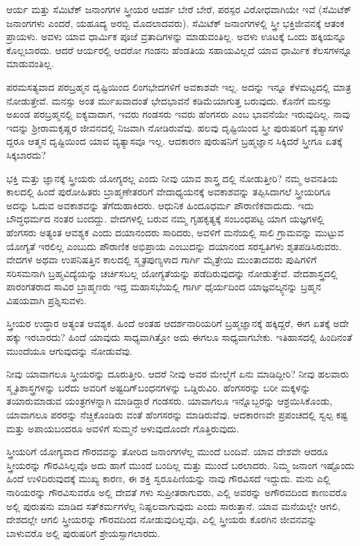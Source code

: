 ಆರ್ಯ ಮತ್ತು ಸೆಮಿಟೆಕ್ ಜನಾಂಗಗಳ ಸ್ತ್ರೀಯರ ಆದರ್ಶ ಬೇರೆ ಬೇರೆ, ಪರಸ್ಪರ ವಿರೋಧವಾಗಿಯೇ ಇವೆ (ಸೆಮಿಟೆಕ್ ಜನಾಂಗಗಳು ಎಂದರೆ, ಯಹೂದ್ಯ ಅರಬ್ಬಿ ಮೊದಲಾದವರು). ಸೆಮಿಟೆಕ್ ಜನಾಂಗಗಳಲ್ಲಿ ಸ್ತ್ರೀ ಭಕ್ತಿಜೀವನಕ್ಕೆ ಆತಂಕ ಪ್ರಾಯಳು. ಅವಳು ಯಾವ ಧಾರ್ಮಿಕ ಪೂಜೆ ವ್ರತಾದಿಗಳನ್ನು ಮಾಡುವಂತಿಲ್ಲ. ಅವಳು ಊಟಕ್ಕೆ ಒಂದು ಹಕ್ಕಿಯನ್ನೂ ಕೊಲ್ಲಬಾರದು. ಆದರೆ ಆರ್ಯರಲ್ಲಿ ಆದರೋ ಗಂಡನು ಹೆಂಡತಿಯ ಸಹಾಯವಿಲ್ಲದೆ ಯಾವ ಧಾರ್ಮಿಕ ಕೆಲಸಗಳನ್ನೂ ಮಾಡುವಂತಿಲ್ಲ.

ಪರಮಸತ್ಯವಾದ ಪರಬ್ರಹ್ಮನ ದೃಷ್ಟಿಯಿಂದ ಲಿಂಗಭೇದಗಳಿಗೆ ಅವಕಾಶವೇ ಇಲ್ಲ. ಅದನ್ನು ಇನ್ನೂ ಕೆಳಮಟ್ಟದಲ್ಲಿ ಮಾತ್ರ ನೋಡುತ್ತೇವೆ. ಮನಸ್ಸು ಅಂತ ರ್ಮುಖವಾದಂತೆ ಭೇದಭಾವನೆ ಕಡಿಮೆಯಾಗುತ್ತ ಬರುವುದು. ಕೊನೆಗೆ ಮನಸ್ಸು ಅಖಂಡ ಪರಬ್ರಹ್ಮನಲ್ಲಿ ಐಕ್ಯವಾದಾಗ, ಇವರು ಗಂಡಸರು ಇವರು ಹೆಂಗಸರು ಎಂಬ ಭಾವನೆಯೇ ಇರುವುದಿಲ್ಲ. ನಾವು ಇದನ್ನು ಶ್ರೀರಾಮಕೃಷ್ಣರ ಜೀವನದಲ್ಲಿ ನಿಜವಾಗಿ ನೋಡಿರುವೆವು. ಹಲವು ದೃಷ್ಟಿಯಿಂದ ಸ್ತ್ರೀ ಪುರುಷರಿಗೆ ವ್ಯತ್ಯಾಸಗಳಿ ದ್ದರೂ ಆತ್ಮನ ದೃಷ್ಟಿಯಿಂದ ಯಾವ ವ್ಯತ್ಯಾಸವೂ ಇಲ್ಲ. ಆದಕಾರಣ ಪುರುಷನಿಗೆ ಬ್ರಹ್ಮಜ್ಞಾನ ಸಿಕ್ಕಿದರೆ ಸ್ತ್ರೀಗೂ ಏತಕ್ಕೆ ಸಿಕ್ಕಬಾರದು?

ಭಕ್ತಿ ಮತ್ತು ಜ್ಞಾನಕ್ಕೆ ಸ್ತ್ರೀಯರು ಯೋಗ್ಯರಲ್ಲ ಎಂದು ನೀವು ಯಾವ ಶಾಸ್ತ್ರ ದಲ್ಲಿ ನೋಡುತ್ತೀರಿ? ನಮ್ಮ ಅವನತಿಯ ಕಾಲದಲ್ಲಿ ಹಿಂದೆ ಪುರೋಹಿತರು ಬ್ರಾಹ್ಮಣೇತರರಿಗೆ ವೇದಾಧ್ಯಯನಕ್ಕೆ ಅವಕಾಶವನ್ನು ತಪ್ಪಿಸಿದಾಗಲೆ ಸ್ತ್ರೀಯರಿಗೂ ಅದನ್ನು ಓದುವ ಅವಕಾಶವನ್ನು ತೆಗೆದುಹಾಕಿದರು. ಆಧುನಿಕ ಹಿಂದೂಧರ್ಮ ಪೌರಾಣಿಕವಾದುದು. ಇದು ಬೌದ್ಧಧರ್ಮದ ನಂತರ ಬಂದದ್ದು. ವೇದಗಳಲ್ಲಿ ಬರುವ ನಮ್ಮ ಗೃಹಕೃತ್ಯಕ್ಕೆ ಸಂಬಂಧಪಟ್ಟ ಯಾಗ ಯಜ್ಞಗಳಲ್ಲಿ ಹೆಂಗಸರು ಅತ್ಯಂತ ಆವಶ್ಯಕ ಎಂದು ದಯಾನಂದರು ಸಾರಿದರು, ಅವಳಿಗೆ ಮನೆಯಲ್ಲಿ ಸಾಲಿ ಗ್ರಾಮವನ್ನು ಮುಟ್ಟುವ ಯೋಗ್ಯತೆ ಇರಲಿಲ್ಲ ಎಂಬುದು ಪೌರಾಣಿಕ ಅಭಿಪ್ರಾಯ ಎಂಬುದನ್ನು ದಯಾನಂದ ಸರಸ್ವತಿಗಳು ಶೃತಪಡಿಸಿರುವರು. ವೇದಗಳ ಅಥವಾ ಉಪನಿಷತ್ತಿನ ಕಾಲದಲ್ಲಿ ಸ್ಮೃತಪುಣ್ಯಳಾದ ಗಾರ್ಗಿ ಮೈತ್ರೇಯಿ ಮುಂತಾದವರು ಪುಷಿಗಳಿಗೆ ಸರಿಸಮನಾಗಿ ಬ್ರಹ್ಮವಿದ್ಯೆಯನ್ನು ಚರ್ಚಿಸಬಲ್ಲ ಯೋಗ್ಯತೆಯನ್ನು ಪಡೆದಿರುವುದನ್ನು ನೋಡುತ್ತೇವೆ. ವೇದಶಾಸ್ತ್ರದಲ್ಲಿ ಪಾರಂಗತರಾದ ಸಾವಿರ ಬ್ರಾಹ್ಮಣರು ಇದ್ದ ಮಹಾಸಭೆಯಲ್ಲಿ ಗಾರ್ಗಿ ಧೈರ್ಯದಿಂದ ಯಾಜ್ಞವಲ್ಕ್ಯನನ್ನು ಬ್ರಹ್ಮನ ವಿಷಯವಾಗಿ ಪ್ರಶ್ನಿಸುವಳು.

ಸ್ತ್ರೀಯರ ಉದ್ಧಾರ ಅತ್ಯಂತ ಆವಶ್ಯಕ. ಹಿಂದೆ ಅಂತಹ ಆದರ್ಶನಾರಿಯರಿಗೆ ಬ್ರಹ್ಮಜ್ಞಾನಕ್ಕೆ ಹಕ್ಕಿದ್ದರೆ, ಈಗ ಏತಕ್ಕೆ ಅದೇ ಹಕ್ಕು ಇರಬಾರದು? ಹಿಂದೆ ಯಾವುದು ಸಾಧ್ಯವಾಗಿತ್ತೋ ಅದು ಈಗಲೂ ಸಾಧ್ಯವಾಗಬೇಕು. ಇತಿಹಾಸದಲ್ಲಿ ಹಿಂದಿನಂತೆ ಮುಂದೆಯೂ ಆಗುವುದನ್ನು ನೋಡುವೆವು.

ನೀವು ಯಾವಾಗಲೂ ಸ್ತ್ರೀಯರನ್ನು ದೂರುತ್ತೀರಿ. ಆದರೆ ನೀವು ಅವರ ಮೇಲ್ಮೆಗೆ ಏನು ಮಾಡಿದ್ದೀರಿ? ನೀವು ಹಲವಾರು ಸ್ಮೃತಿಶಾಸ್ತ್ರಗಳನ್ನು ಬರೆದು ಅವರಿಗೆ ಅಷ್ಟದಿಗ್​ಬಂಧನಗಳನ್ನು ಒಡ್ಡಿರುವಿರಿ. ಹೆಂಗಸರನ್ನು ಬರೀ ಮಕ್ಕಳನ್ನು ತಯಾರುಮಾಡುವ ಯಂತ್ರಗಳನ್ನಾಗಿ ಮಾಡಿದ್ದಾರೆ ಗಂಡಸರು. ಯಾವಾಗಲೂ ಇನ್ನೊಬ್ಬರನ್ನು ಆಶ್ರಯಿಸಿಕೊಂಡು, ಯಾವಾಗಲೂ ಪರರನ್ನು ನೆಚ್ಚಿಕೊಂಡಿರು ವಂತೆ ಹೆಂಗಸರನ್ನು ಮಾಡಿರುವೆವು. ಆದಕಾರಣವೇ ಪ್ರಪಂಚದಲ್ಲಿ ಸ್ವಲ್ಪ ಕಷ್ಟ ಮತ್ತು ಅಪಾಯಬಂದರೂ ಅವಳಿಗೆ ಸುಮ್ಮನೆ ಅಳುವುದೊಂದೇ ಗೊತ್ತಿರುವುದು.

ಸ್ತ್ರೀಯರಿಗೆ ಯೋಗ್ಯವಾದ ಗೌರವವನ್ನು ತೋರಿದ ಜನಾಂಗಗಳೆಲ್ಲ ಮುಂದೆ ಬಂದಿವೆ. ಯಾವ ದೇಶವೇ ಆದರೂ ಸ್ತ್ರೀಯರನ್ನು ಗೌರವಿಸಿಲ್ಲವೊ ಅದು ಹಾಗೆ ಮುಂದೆ ಬಂದಿಲ್ಲ ಮತ್ತು ಮುಂದೆ ಬರಲಾದರು. ನಿಮ್ಮ ಜನಾಂಗ ಇಷ್ಟೊಂದು ಹಿಂದೆ ಉಳಿದಿರುವುದಕ್ಕೆ ಮುಖ್ಯ ಕಾರಣ, ಈ ಶಕ್ತಿ ಸ್ವರೂಪಿಣಿಯನ್ನು ನಾವು ಗೌರವಿಸದೆ ಇದ್ದುದು. ಮನು ಎಲ್ಲಿ ನಾರಿಯರನ್ನು ಗೌರವಿಸುವರೊ ಅಲ್ಲಿ ದೇವತೆ ಗಳು ಸುಪ್ರೀತರಾಗುವರು, ಎಲ್ಲಿ ಅವರನ್ನು ಅಗೌರವದಿಂದ ಕಾಣುವರೊ ಅಲ್ಲಿ ಪುರುಷನು ಮಾಡಿದ ಸತ್​ಕರ್ಮಗಳೆಲ್ಲ ನಿಷ್ಫಲವಾಗುವುದು ಎಂದು ಸಾರುತ್ತಾನೆ. ಯಾವ ಮನೆಯಲ್ಲೇ ಆಗಲಿ, ದೇಶದಲ್ಲೇ ಆಗಲಿ ಸ್ತ್ರೀಯರನ್ನು ಗೌರವದಿಂದ ನೋಡುವುದಿಲ್ಲವೊ, ಎಲ್ಲಿ ಸ್ತ್ರೀಯರು ಕೊರಗಿನ ಜೀವನವನ್ನು ಬಾಳುವರೊ ಅಲ್ಲಿ ಪುರುಷರಿಗೆ ಶ್ರೇಯಸ್ಸಾಗಲಾರದು.

